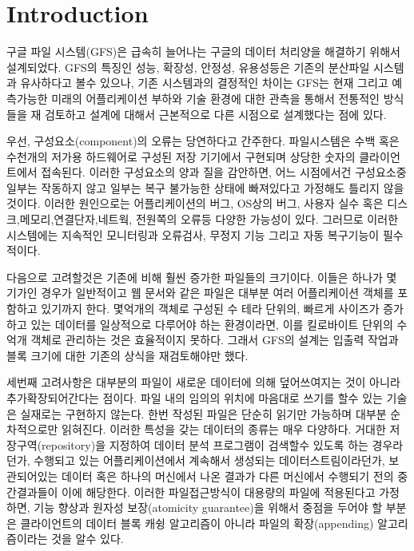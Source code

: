 \documentclass[twocolumn]{article}
\begin{document}
\section{Introduction}


 구글 파일 시스템(GFS)은 급속히 늘어나는 구글의 데이터 처리양을 해결하기 위해서 설계되었다.  GFS의 특징인 성능, 확장성, 안정성, 유용성등은 기존의 분산파일 시스템과 유사하다고 볼수 있으나,  기존 시스템과의 결정적인 차이는 GFS는 현재 그리고 예측가능한 미래의 어플리케이션 부하와 기술 환경에 대한 관측을 통해서 전통적인 방식들을 재 검토하고 설계에 대해서 근본적으로 다른 시점으로 설계했다는 점에 있다.

 우선, 구성요소(component)의 오류는 당연하다고 간주한다.  파일시스템은 수백 혹은 수천개의 저가용 하드웨어로 구성된 저장 기기에서 구현되며 상당한 숫자의 클라이언트에서 접속된다.  이러한 구성요소의 양과 질을 감안하면, 어느 시점에서건 구성요소중 일부는 작동하지 않고 일부는 복구 불가능한 상태에 빠져있다고 가정해도 틀리지 않을것이다.  이러한 원인으로는 어플리케이션의 버그, OS상의 버그, 사용자 실수 혹은 디스크,메모리,연결단자,네트웍, 전원쪽의 오류등 다양한 가능성이 있다.  그러므로 이러한 시스템에는 지속적인 모니터링과 오류검사, 무정지 기능 그리고 자동 복구기능이 필수적이다.

 다음으로 고려할것은 기존에 비해 훨씬 증가한 파일들의 크기이다.  이들은 하나가 몇 기가인 경우가 일반적이고 웹 문서와 같은 파일은 대부분 여러 어플리케이션 객체를 포함하고 있기까지 한다.  몇억개의 객체로 구성된 수 테라 단위의, 빠르게 사이즈가 증가하고 있는 데이터를 일상적으로 다루어야 하는 환경이라면, 이를 킬로바이트 단위의 수 억개 객체로 관리하는 것은 효율적이지 못하다.  그래서 GFS의 설계는 입출력 작업과 블록 크기에 대한 기존의 상식을 재검토해야만 했다.

 세번째 고려사항은 대부분의 파일이 새로운 데이터에 의해 덮어쓰여지는 것이 아니라 추가확장되어간다는 점이다.  파일 내의 임의의 위치에 마음대로 쓰기를 할수 있는 기술은 실재로는 구현하지 않는다.  한번 작성된 파일은 단순히 읽기만 가능하며 대부분 순차적으로만 읽혀진다.  이러한 특성을 갖는 데이터의 종류는 매우 다양하다.  거대한 저장구역(repository)을 지정하여 데이터 분석 프로그램이 검색할수 있도록 하는 경우라던가, 수행되고 있는 어플리케이션에서 계속해서 생성되는 데이터스트림이라던가, 보관되어있는 데이터 혹은 하나의 머신에서 나온 결과가 다른 머신에서 수행되기 전의 중간결과들이 이에 해당한다.  이러한 파일접근방식이 대용량의 파일에 적용된다고 가정하면, 기능 향상과 원자성 보장(atomicity guarantee)을 위해서 중점을 두어야 할 부분은 클라이언트의 데이터 블록 캐슁 알고리즘이 아니라 파일의 확장(appending) 알고리즘이라는 것을 알수 있다.
\end{document}
